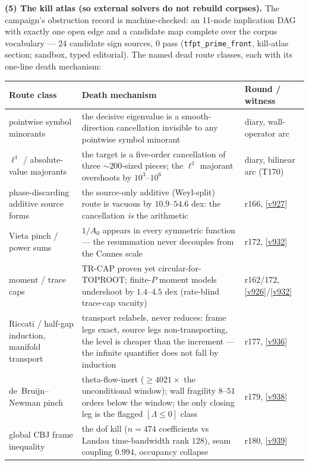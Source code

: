 \documentclass[11pt,a4paper]{article}
\begin{document}
\par\smallskip\noindent\textbf{(5) The kill atlas (so external solvers do not rebuild
corpses).}  The campaign's obstruction record is machine-checked: an 11-node implication DAG
with exactly one open edge and a candidate map complete over the corpus vocabulary --- 24
candidate sign sources, $0$ pass (\texttt{tfpt\_prime\_front}, kill-atlas section; sandbox,
typed editorial).  The named dead route classes, each with its one-line death mechanism:
\begin{center}\footnotesize
\renewcommand{\arraystretch}{1.22}
\begin{tabularx}{\linewidth}{@{}>{\hsize=0.62\hsize\raggedright\arraybackslash}X>{\hsize=1.08\hsize\raggedright\arraybackslash}X>{\hsize=0.30\hsize\raggedright\arraybackslash}X@{}}
\toprule
\textbf{Route class} & \textbf{Death mechanism} & \textbf{Round / witness} \\
\midrule
pointwise symbol minorants & the decisive eigenvalue is a smooth-direction cancellation invisible to any pointwise symbol minorant & diary, wall-operator arc \\
$\ell^1$ / absolute-value majorants & the target is a five-order cancellation of three ${\sim}200$-sized pieces; the $\ell^1$ majorant overshoots by $10^{3}$--$10^{6}$ & diary, bilinear arc (T170) \\
phase-discarding additive source forms & the source-only additive (Weyl-split) route is vacuous by $10.9$--$54.6$ dex: the cancellation \emph{is} the arithmetic & r166, \vref{v927} \\
Vieta pinch / power sums & $1/A_0$ appears in every symmetric function --- the resummation never decouples from the Connes scale & r172, \vref{v932} \\
moment / trace caps & TR-CAP proven yet circular-for-TOPROOT; finite-$P$ moment models undershoot by $1.4$--$4.5$ dex (rate-blind trace-cap vacuity) & r162/172, \vref{v926}/\vref{v932} \\
Riccati / half-gap induction, manifold transport & transport relabels, never reduces: frame legs exact, source legs non-transporting, the level is cheaper than the increment --- the infinite quantifier does not fall by induction & r177, \vref{v936} \\
de~Bruijn--Newman pinch & theta-flow-inert ($\ge 4021\times$ the unconditional window); wall fragility $8$--$51$ orders below the window; the only closing leg is the flagged $[\Lambda \le 0]$ class & r179, \vref{v938} \\
global CBJ frame inequality & the dof kill ($n = 474$ coefficients vs Landau time-bandwidth rank $128$), seam coupling $0.994$, occupancy collapse & r180, \vref{v939} \\

\end{tabularx}
\end{center}
\end{document}
